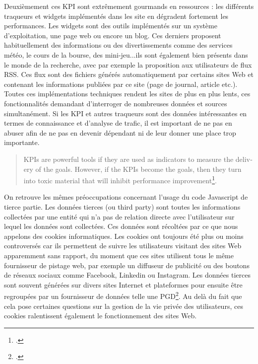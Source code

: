 \documentclass[a4paper,12pt,twoside]{book}
\begin{document}
Deuxièmement ces \acrshort{KPI} sont extrêmement gourmands en ressources : les différents traqueurs et widgets implémentés dans les site en dégradent fortement les performances. Les widgets sont des outils implémentés sur un système d'exploitation, une page web ou encore un blog. Ces derniers proposent habituellement des informations ou des divertissements comme des services météo, le cours de la bourse, des mini-jeu...ils sont également bien présents dans le monde de la recherche, avec par exemple la proposition aux utilisateurs de flux RSS. Ces flux sont des fichiers générés automatiquement par certains sites Web et contenant les informations publiées par ce site (page de journal, article etc.). Toutes ces implémentations techniques rendent les sites de plus en plus lents, ces fonctionnalités demandant d'interroger de nombreuses données et sources simultanément.
Si les \acrshort{KPI} et autres traqueurs sont des données intéressantes en termes de connaissance et d'analyse de trafic, il est important de ne pas en abuser afin de ne pas en devenir dépendant ni de leur donner une place trop importante. 
\begin{otherlanguage}{english}
\begin{quote}
    KPIs are powerful tools if they are used as indicators to measure the delivery of the goals. However, if the KPIs become the goals, then they turn into toxic material that will inhibit performance improvement\footcite{marr_caution_2021}.
\end{quote}
\end{otherlanguage}


On retrouve les mêmes préoccupations concernant l'usage du code Javascript de tierce partie. Les données tierces (ou third party) sont toutes les informations collectées par une entité qui n'a pas de relation directe avec l'utilisateur sur lequel les données sont collectées. Ces données sont récoltées par ce que nous appelons des \og cookies \fg informatiques. Les cookies ont toujours été plus ou moins controversés car ils permettent de suivre les utilisateurs visitant des sites Web apparemment sans rapport, du moment que ces sites utilisent tous le même fournisseur de pistage web, par exemple un diffuseur de publicité ou des boutons de réseaux sociaux comme Facebook, Linkedin ou Instagram. Les données tierces sont souvent générées sur divers sites Internet et plateformes pour ensuite être regroupées par un fournisseur de données telle une \acrfull{PGD}\footcite{third_party}. Au delà du fait que cela pose certaines questions sur la gestion de la vie privée des utilisateurs, ces cookies ralentissent également le fonctionnement des sites Web.
\end{document}
